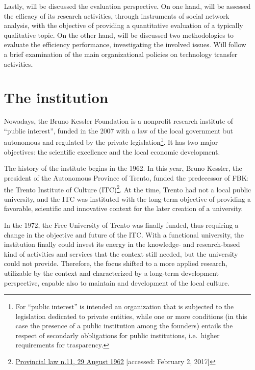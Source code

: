Lastly, will be discussed the evaluation perspective. On one hand, will be assessed the efficacy of its research activities, through instruments of social network analysis, with the objective of providing a quantitative evaluation of a typically qualitative topic. On the other hand, will be discussed two methodologies to evaluate the efficiency performance, investigating the involved issues. Will follow a brief examination of the main organizational policies on technology transfer activities.

\section{The institution}

Nowadays, the Bruno Kessler Foundation is a nonprofit research institute of \enquote{public interest}, funded in the 2007 with a law of the local government but autonomous and regulated by the private legislation\footnote{For \enquote{public interest} is intended an organization that is subjected to the legislation dedicated to private entities, while one or more conditions (in this case the presence of a public institution among the founders) entails the respect of secondarly obbligations for public institutions, i.e.\ higher requirements for trasparency.}. It has two major objectives: the scientific excellence and the local economic development.

The history of the institute begins in the 1962. In this year, Bruno Kessler, the president of the Autonomous Province of Trento, funded the predecessor of FBK: the Trento Institute of Culture (ITC)\footnote{
	\href{http://www.consiglio.provincia.tn.it/leggi-e-archivi/codice-provinciale/archivio/Pages/Legge\%20provinciale\%2029\%20agosto\%201962,\%20n.\%2011_565.aspx}
	{Provincial law n.11, 29 August 1962}
	[accessed: February 2, 2017]
}. At the time, Trento had not a local public university, and the ITC was instituted with the long-term objective of providing a favorable, scientific and innovative context for the later creation of a university. 

In the 1972, the Free University of Trento was finally funded, thus requiring a change in the objective and future of the ITC. With a functional university, the institution finally could invest its energy in the knowledge- and research-based kind of activities and services that the context still needed, but the university could not provide. Therefore, the focus shifted to a more applied research, utilizable by the context and characterized by a long-term development perspective, capable also to maintain and development of the local culture.


